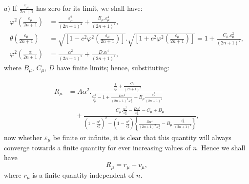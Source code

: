 \documentclass{article}
\begin{document}
$a)$ If $\frac{\varepsilon_{\mu}}{2n+1}$ has zero for its limit, we shall have:
\[ \begin{aligned}
\varphi^{2}\left(\frac{\varepsilon_{\mu}}{2n+1}\right)&=\frac{\varepsilon_{\mu}^{2}}{(2n+1)^{2}}+\frac{B_{\mu}.\varepsilon_{\mu}^{4}}{(2n+1)^{4}},\\
\theta\left(\frac{\varepsilon_{\mu}}{2n+1}\right)&=\sqrt{\left[1-c^{2}\varphi^{2}\left(\frac{\varepsilon_{\mu}}{2n+1}\right)\right]}.\sqrt{\left[1+e^{2}\varphi^{2}\left(\frac{\varepsilon_{\mu}}{2n+1}\right)\right]}=1+\frac{C_{\mu}.\varepsilon_{\mu}^{2}}{(2n+1)^{2}},\\
\varphi^{2}\left(\frac{\alpha}{2n+1}\right)&=\frac{\alpha^{2}}{(2n+1)^{2}}+\frac{D.\alpha^{4}}{(2n+1)^{4}},
\end{aligned} \]
where $B_{\mu}$, $C_{\mu}$, $D$ have finite limits; hence, substituting:

\[ \begin{aligned}
R_{\mu}&=A\alpha^{2}.\frac{\frac{1}{\varepsilon_{\mu}^{2}}+\frac{C_{\mu}}{(2n+1)^{2}}}{\frac{\alpha^{2}}{\varepsilon_{\mu}^{2}}-1+\frac{D\alpha^{4}}{(2n+1)^{2}.\varepsilon_{\mu}^{2}}-B_{\mu}\frac{\varepsilon_{\mu}^{2}}{(2n+1)^{2}}}\\
&\quad+\frac{C_{\mu}.\frac{\alpha^{2}}{\varepsilon_{\mu}^{2}}-\frac{D\alpha^{4}}{\varepsilon_{\mu}^{4}}-C_{\mu}+B_{\mu}}{\left(1-\frac{\alpha^{2}}{\varepsilon_{\mu}^{2}}\right)^{2}-\left(1-\frac{\alpha^{2}}{\varepsilon_{\mu}^{2}}\right)\left\{\frac{D\alpha^{4}}{(2n+1)^{2}.\varepsilon_{\mu}^{2}}-B_{\mu}.\frac{\varepsilon_{\mu}^{2}}{(2n+1)^{2}}\right\}},
\end{aligned} \tag{139.} \]
now whether $\varepsilon_{\mu}$ be finite or infinite, it is clear that this quantity will always converge towards a finite quantity for ever increasing values of $n$. Hence we shall have
\[ R_{\mu}=r_{\mu}+v_{\mu}, \tag{140.} \]
where $r_{\mu}$ is a finite quantity independent of $n$.
\end{document}
